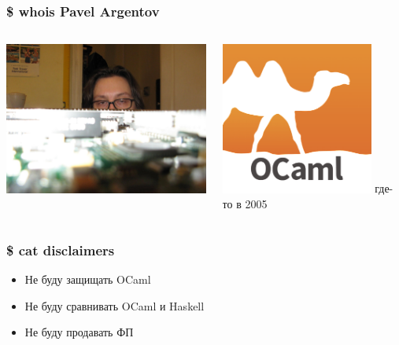 \begin{frame}
  \frametitle{\$ whois Pavel Argentov}
  \large
  \vspace{8mm}
  \begin{columns}
    \begin{column}{8cm}
      \includegraphics[width=8cm,keepaspectratio]{./images/ag_cisco.jpg}
    \end{column}

    \begin{column}{5cm}
      \includegraphics[width=5cm,keepaspectratio]{./images/ocaml_logo.png}
      где-то в 2005
    \end{column}
  \end{columns}
\end{frame}

\begin{frame}
  \frametitle{\$ cat disclaimers}
  \begin{center}
    \LARGE
    \begin{itemize}
      \item Не буду защищать OCaml \pause
      \item Не буду сравнивать OCaml и Haskell \pause
      \item Не буду продавать ФП
    \end{itemize}
  \end{center}
\end{frame}

